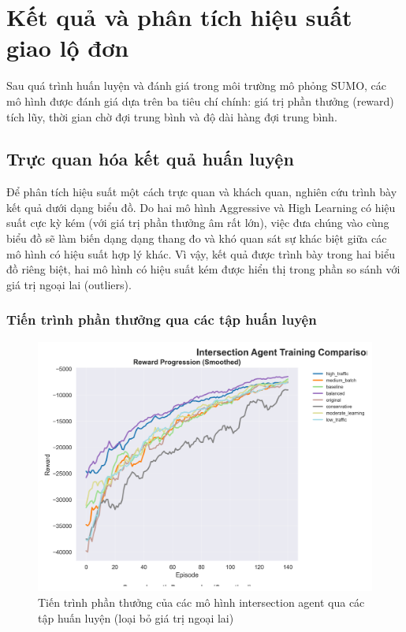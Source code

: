 \section{Kết quả và phân tích hiệu suất giao lộ đơn}

Sau quá trình huấn luyện và đánh giá trong môi trường mô phỏng SUMO, các mô hình được đánh giá dựa trên ba tiêu chí chính: giá trị phần thưởng (reward) tích lũy, thời gian chờ đợi trung bình và độ dài hàng đợi trung bình.

\subsection{Trực quan hóa kết quả huấn luyện}

Để phân tích hiệu suất một cách trực quan và khách quan, nghiên cứu trình bày
kết quả dưới dạng biểu đồ. Do hai mô hình Aggressive và High Learning có hiệu suất cực kỳ kém (với giá trị phần thưởng âm rất lớn), việc đưa chúng vào cùng biểu đồ sẽ làm biến dạng dạng thang đo và khó quan sát sự khác biệt giữa các mô hình có hiệu suất hợp lý khác. Vì vậy, kết quả được trình bày trong hai biểu đồ riêng biệt, hai mô hình có hiệu suất kém được hiển thị trong phần so sánh với giá trị ngoại lai (outliers).

\subsubsection{Tiến trình phần thưởng qua các tập huấn luyện}

\begin{figure}[!htp]
    \centering
    \includegraphics[width=\textwidth]{figures/individual_plots/intersection_filtered_reward_progress.png}
    \caption{Tiến trình phần thưởng của các mô hình intersection agent qua các tập huấn luyện (loại bỏ giá trị ngoại lai)}
    \label{fig:intersection_filtered_reward_progress}
\end{figure}

